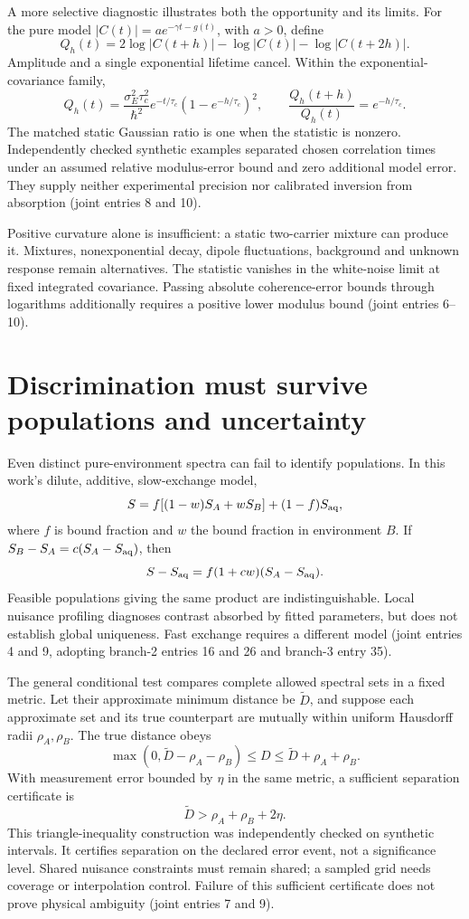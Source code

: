 \documentclass{article}
\begin{document}
A more selective diagnostic illustrates both the opportunity and its limits. For the pure model \(|C(t)|=a e^{-\gamma t-g(t)}\), with \(a>0\), define
\[
 Q_h(t)=2\log|C(t+h)|-\log|C(t)|-\log|C(t+2h)|.
\]
Amplitude and a single exponential lifetime cancel. Within the exponential-covariance family,
\[
 Q_h(t)=\frac{\sigma_E^2\tau_c^2}{\hbar^2}
 e^{-t/\tau_c}(1-e^{-h/\tau_c})^2,
 \qquad \frac{Q_h(t+h)}{Q_h(t)}=e^{-h/\tau_c}.
\]
The matched static Gaussian ratio is one when the statistic is nonzero. Independently checked synthetic examples separated chosen correlation times under an assumed relative modulus-error bound and zero additional model error. They supply neither experimental precision nor calibrated inversion from absorption (joint entries 8 and 10).

Positive curvature alone is insufficient: a static two-carrier mixture can produce it. Mixtures, nonexponential decay, dipole fluctuations, background and unknown response remain alternatives. The statistic vanishes in the white-noise limit at fixed integrated covariance. Passing absolute coherence-error bounds through logarithms additionally requires a positive lower modulus bound (joint entries 6--10).

\section{Discrimination must survive populations and uncertainty}

Even distinct pure-environment spectra can fail to identify populations. In this work's dilute, additive, slow-exchange model,
\[
 S=f[(1-w)S_A+wS_B]+(1-f)S_{\rm aq},
\]
where \(f\) is bound fraction and \(w\) the bound fraction in environment \(B\). If \(S_B-S_A=c(S_A-S_{\rm aq})\), then
\[
 S-S_{\rm aq}=f(1+cw)(S_A-S_{\rm aq}).
\]
Feasible populations giving the same product are indistinguishable. Local nuisance profiling diagnoses contrast absorbed by fitted parameters, but does not establish global uniqueness. Fast exchange requires a different model (joint entries 4 and 9, adopting branch-2 entries 16 and 26 and branch-3 entry 35).

The general conditional test compares complete allowed spectral sets in a fixed metric. Let their approximate minimum distance be \(\widetilde D\), and suppose each approximate set and its true counterpart are mutually within uniform Hausdorff radii \(\rho_A,\rho_B\). The true distance obeys
\[
 \max(0,\widetilde D-\rho_A-\rho_B)
 \leq D\leq\widetilde D+\rho_A+\rho_B.
\]
With measurement error bounded by \(\eta\) in the same metric, a sufficient separation certificate is
\[
 \widetilde D>\rho_A+\rho_B+2\eta.
\]
This triangle-inequality construction was independently checked on synthetic intervals. It certifies separation on the declared error event, not a significance level. Shared nuisance constraints must remain shared; a sampled grid needs coverage or interpolation control. Failure of this sufficient certificate does not prove physical ambiguity (joint entries 7 and 9).
\end{document}
